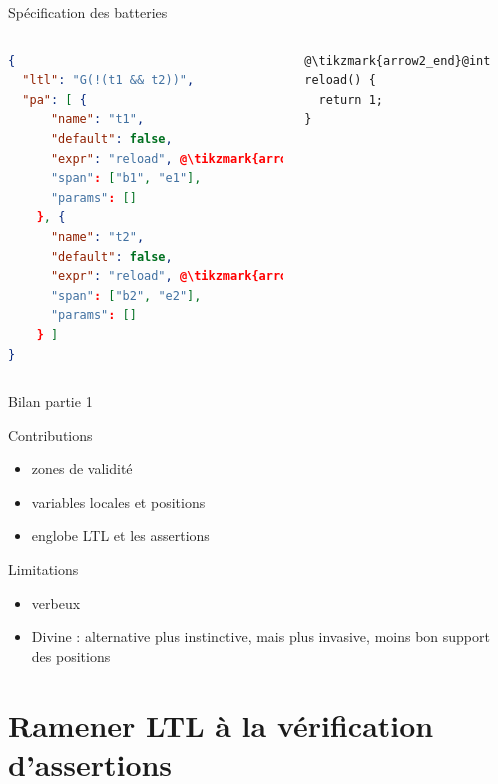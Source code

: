\documentclass{beamer}
\newcommand{\tikzmark}[2][]{%
  \tikz[remember picture,overlay,baseline=-.5ex] \node[#1] (#2) {};%
}
\begin{document}
\begin{frame}[fragile]{Spécification des batteries}
  \begin{columns}
\begin{lstlisting}[basicstyle=\small, language=json]
{
  "ltl": "G(!(t1 && t2))",
  "pa": [ {
      "name": "t1",
      "default": false,
      "expr": "reload", @\tikzmark{arrow2_begin}@
      "span": ["b1", "e1"],
      "params": []
    }, {
      "name": "t2",
      "default": false,
      "expr": "reload", @\tikzmark{arrow3_begin}@
      "span": ["b2", "e2"],
      "params": []
    } ]
}
\end{lstlisting}
\begin{lstlisting}[frame=l]
@\tikzmark{arrow2_end}@int reload() {
  return 1;
}
\end{lstlisting}

  \end{columns}

\end{frame}

\begin{frame}{Bilan partie 1}
  \begin{block}{Contributions}
    \begin{itemize}
    \item zones de validité
    \item variables locales et positions
    \item englobe LTL et les assertions
    \end{itemize}
  \end{block}

  \begin{alertblock}{Limitations}
    \begin{itemize}
    \item verbeux
    \item Divine : alternative plus instinctive,
    mais plus invasive, moins bon support des positions
    \end{itemize}
  \end{alertblock}

\end{frame}

\section{Ramener LTL à la vérification d'assertions}
\end{document}
